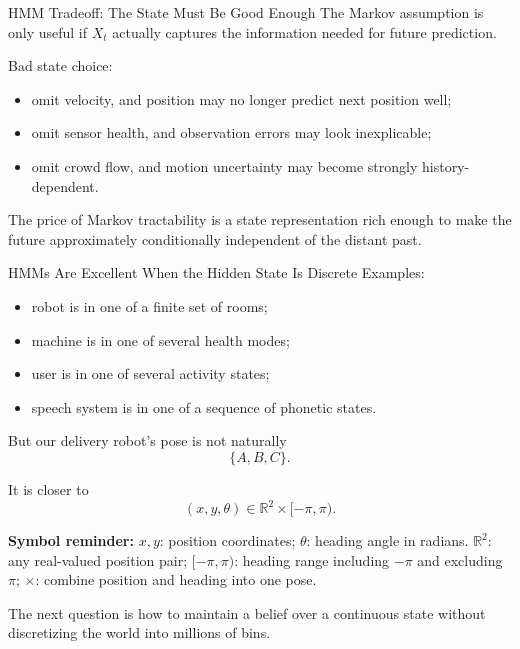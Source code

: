 \documentclass[aspectratio=169,10pt]{beamer}
\newcommand{\equationlegend}[1]{%
  \par\smallskip
  \begingroup
    \setlength{\fboxsep}{5pt}%
    \noindent\colorbox{DeckSoft}{%
      \parbox{\dimexpr\linewidth-2\fboxsep\relax}{%
        \footnotesize\textbf{Symbol reminder:} #1%
      }%
    }\par
  \endgroup
  \smallskip
}
\begin{document}
\begin{frame}[shrink=10]{HMM Tradeoff: The State Must Be Good Enough}
  The Markov assumption is only useful if $X_t$ actually captures the information needed for future prediction.

  Bad state choice:
  \begin{itemize}
    \item omit velocity, and position may no longer predict next position well;
    \item omit sensor health, and observation errors may look inexplicable;
    \item omit crowd flow, and motion uncertainty may become strongly history-dependent.
  \end{itemize}

  \begin{keyidea}
    The price of Markov tractability is a state representation rich enough to make the future approximately conditionally independent of the distant past.
  \end{keyidea}
\end{frame}

\begin{frame}[shrink=10]{HMMs Are Excellent When the Hidden State Is Discrete}
  Examples:
  \begin{itemize}
    \item robot is in one of a finite set of rooms;
    \item machine is in one of several health modes;
    \item user is in one of several activity states;
    \item speech system is in one of a sequence of phonetic states.
  \end{itemize}

  But our delivery robot's pose is not naturally
  \[
    \{A,B,C\}.
  \]

  It is closer to
  \[
    (x,y,\theta)\in\mathbb{R}^2\times[-\pi,\pi).
  \]

  \equationlegend{$x,y$: position coordinates; $\theta$: heading angle in radians. $\mathbb{R}^2$: any real-valued position pair; $[-\pi,\pi)$: heading range including $-\pi$ and excluding $\pi$; $\times$: combine position and heading into one pose.}

  \begin{keyidea}
    The next question is how to maintain a belief over a continuous state without discretizing the world into millions of bins.
  \end{keyidea}
\end{frame}
\end{document}
